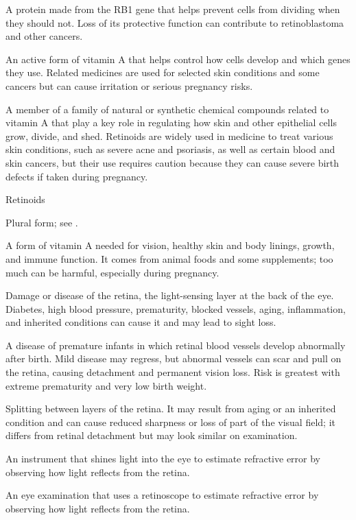  A protein made from the RB1 gene that helps prevent cells from dividing when they should not. Loss of its protective function can contribute to retinoblastoma and other cancers.

 An active form of vitamin A that helps control how cells develop and which genes they use. Related medicines are used for selected skin conditions and some cancers but can cause irritation or serious pregnancy risks.

 A member of a family of natural or synthetic chemical compounds related to vitamin A that play a key role in regulating how skin and other epithelial cells grow, divide, and shed. Retinoids are widely used in medicine to treat various skin conditions, such as severe acne and psoriasis, as well as certain blood and skin cancers, but their use requires caution because they can cause severe birth defects if taken during pregnancy.

\synonyms
Retinoids

 Plural form; see .

 A form of vitamin A needed for vision, healthy skin and body linings, growth, and immune function. It comes from animal foods and some supplements; too much can be harmful, especially during pregnancy.

 Damage or disease of the retina, the light-sensing layer at the back of the eye. Diabetes, high blood pressure, prematurity, blocked vessels, aging, inflammation, and inherited conditions can cause it and may lead to sight loss.

 A disease of premature infants in which retinal
blood vessels develop abnormally after birth. Mild disease may regress, but abnormal
vessels can scar and pull on the retina, causing detachment and permanent vision loss.
Risk is greatest with extreme prematurity and very low birth weight.

 Splitting between layers of the retina. It may result from aging or an inherited condition and can cause reduced sharpness or loss of part of the visual field; it differs from retinal detachment but may look similar on examination.

 An instrument that shines light into the eye to estimate refractive error by observing how light reflects from the retina.

 An eye examination that uses a retinoscope to estimate refractive error by observing how light reflects from the retina.

